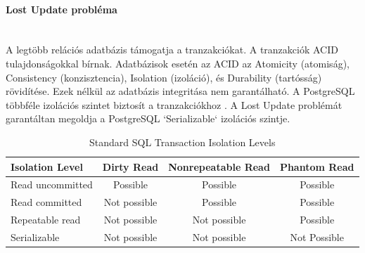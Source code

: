 
\paragraph{Lost Update probléma} \mbox{} \\
A legtöbb relációs adatbázis támogatja a tranzakciókat. A tranzakciók ACID tulajdonságokkal bírnak.
Adatbázisok esetén az ACID az Atomicity (atomiság), Consistency (konzisztencia), Isolation (izoláció), és Durability (tartósság) rövidítése. Ezek nélkül az adatbázis integritása nem garantálható.
A PostgreSQL többféle izolációs szintet biztosít a tranzakciókhoz \cite{postgres-transaction}. A Lost Update problémát garantáltan megoldja a PostgreSQL `Serializable` izolációs szintje.
\begin{table}[h]
    \centering
    \caption{ Standard SQL Transaction Isolation Levels}
    \begin{tabular}{l|c|c|c|}
Isolation Level & Dirty Read  & Nonrepeatable Read & Phantom Read\\
        \hline
Read uncommitted  & Possible & Possible & Possible \\
\hline
Read committed & Not possible & Possible & Possible \\
\hline
Repeatable read & Not possible & Not possible & Possible \\
\hline
Serializable & Not possible & Not possible & Not Possible \\
        \hline
    \end{tabular}
\end{table}

